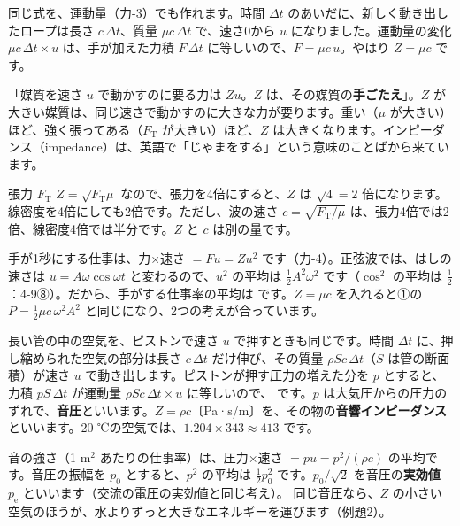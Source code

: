 同じ式を、運動量（力-3）でも作れます。時間 $\Delta t$ のあいだに、新しく動き出したロープは長さ $c\,\Delta t$、質量 $\mu c\,\Delta t$ で、速さ0から $u$ になりました。運動量の変化 $\mu c\,\Delta t\times u$ は、手が加えた力積 $F\,\Delta t$ に等しいので、$F=\mu c\,u$。やはり $Z=\mu c$ です。

\begin{phyomi}[$Z=F/u$]
「媒質を速さ $u$ で動かすのに要る力は $Zu$。$Z$ は、その媒質の\textbf{手ごたえ}」。$Z$ が大きい媒質は、同じ速さで動かすのに大きな力が要ります。重い（$\mu$ が大きい）ほど、強く張ってある（$F_{\mathrm T}$ が大きい）ほど、$Z$ は大きくなります。インピーダンス（impedance）は、英語で「じゃまをする」という意味のことばから来ています。
\end{phyomi}

\begin{phbaisuru}[4倍]{張力 $F_{\mathrm T}$}
$Z=\sqrt{F_{\mathrm T}\mu}$ なので、張力を4倍にすると、$Z$ は $\sqrt4=2$ 倍になります。線密度を4倍にしても2倍です。ただし、波の速さ $c=\sqrt{F_{\mathrm T}/\mu}$ は、張力4倍では2倍、線密度4倍では半分です。$Z$ と $c$ は別の量です。
\end{phbaisuru}

手が1秒にする仕事は、力×速さ $=Fu=Zu^2$ です（力-4）。正弦波では、はしの速さは $u=A\omega\cos\omega t$ と変わるので、$u^2$ の平均は $\tfrac12A^2\omega^2$ です（$\cos^2$ の平均は $\tfrac12$：4-9⑧）。だから、手がする仕事率の平均は
です。$Z=\mu c$ を入れると①の $P=\tfrac12\mu c\,\omega^2A^2$ と同じになり、2つの考えが合っています。

長い管の中の空気を、ピストンで速さ $u$ で押すときも同じです。時間 $\Delta t$ に、押し縮められた空気の部分は長さ $c\,\Delta t$ だけ伸び、その質量 $\rho Sc\,\Delta t$（$S$ は管の断面積）が速さ $u$ で動き出します。ピストンが押す圧力の増えた分を $p$ とすると、力積 $pS\,\Delta t$ が運動量 $\rho Sc\,\Delta t\times u$ に等しいので、
\label{ph:波-7:onkyo}です。$p$ は大気圧からの圧力のずれで、\textbf{音圧}といいます。$Z=\rho c$〔Pa·s/m〕を、その物の\textbf{音響インピーダンス}といいます。20 ℃の空気では、$1.204\times343\approx413$ です。

音の強さ（1 m$^2$ あたりの仕事率）は、圧力×速さ $=pu=p^2/(\rho c)$ の平均です。音圧の振幅を $p_0$ とすると、$p^2$ の平均は $\tfrac12p_0^2$ です。$p_0/\sqrt2$ を音圧の\textbf{実効値} $p_{\mathrm e}$ といいます（交流の電圧の実効値と同じ考え）。
\label{ph:波-7:onI}同じ音圧なら、$Z$ の小さい空気のほうが、水よりずっと大きなエネルギーを運びます（例題2）。

